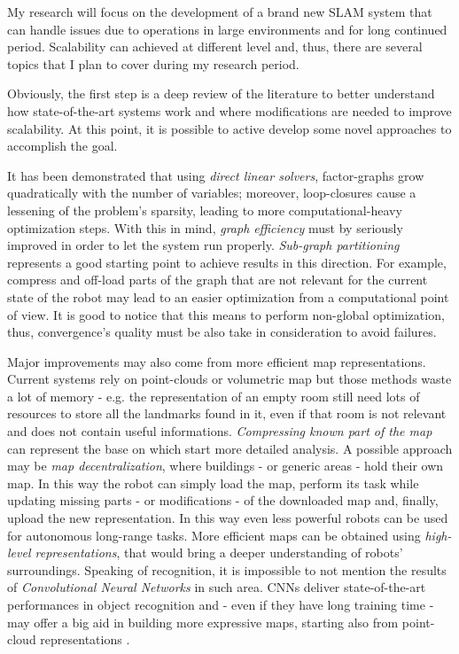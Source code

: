 \documentclass[10pt,a4paper, notitlepage]{report}
\begin{document}
My research will focus on the development of a brand new SLAM system that can handle issues due to operations in large environments and for long continued period. Scalability can achieved at different level and, thus, there are several topics that I plan to cover during my research period.

Obviously, the first step is a deep review of the literature to better understand how state-of-the-art systems work and where modifications are needed to improve scalability. At this point, it is possible to active develop some novel approaches to accomplish the goal.

It has been demonstrated that using \textit{direct linear solvers}, factor-graphs grow quadratically with the number of variables; moreover, loop-closures cause a lessening of the problem's sparsity, leading to more computational-heavy optimization steps. With this in mind, \textit{graph efficiency} must by seriously improved in order to let the system run properly. \textit{Sub-graph partitioning} \cite{grisetti2012condensed-m} represents a good starting point to achieve results in this direction. For example, compress and off-load parts of the graph that are not relevant for the current state of the robot may lead to an easier optimization from a computational point of view. It is good to notice that this means to perform non-global optimization, thus, convergence's quality must be also take in consideration to avoid failures.

Major improvements may also come from more efficient map representations. Current systems rely on point-clouds or volumetric map but those methods waste a lot of memory - e.g. the representation of an empty room still need lots of resources to store all the landmarks found in it, even if that room is not relevant and does not contain useful informations. \textit{Compressing known part of the map} \cite{lynen2015getoutofmylab} can represent the base on which start more detailed analysis. A possible approach may be \textit{map decentralization}, where buildings - or generic areas - hold their own map. In this way the robot can simply load the map, perform its task while updating missing parts - or modifications - of the downloaded map and, finally, upload the new representation. In this way even less powerful robots can be used for autonomous long-range tasks. More efficient maps can be obtained using \textit{high-level representations}, that would bring a deeper understanding of robots' surroundings. Speaking of recognition, it is impossible to not mention the results of \textit{Convolutional Neural Networks} \cite{krizhevsky2012alexnet} in such area. CNNs deliver state-of-the-art performances in object recognition and - even if they have long training time - may offer a big aid in building more expressive maps, starting also from point-cloud representations \cite{maturana2015voxnet}.
\end{document}
